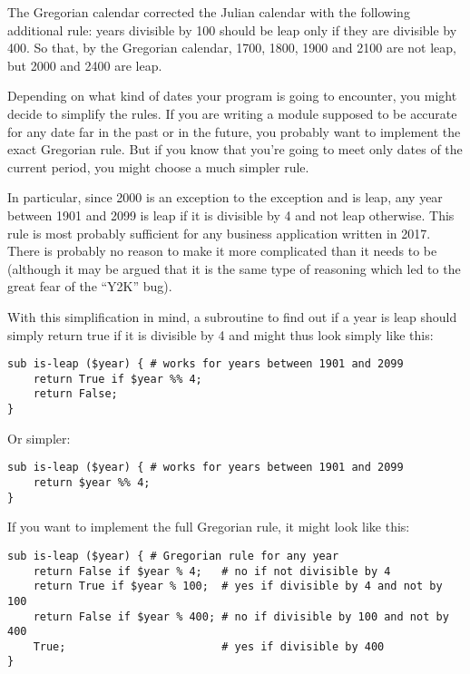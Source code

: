 {
The Gregorian calendar corrected the Julian calendar with 
the following additional rule: years divisible by 100 should 
be leap only if they are divisible by 400. So that, by the Gregorian calendar, 1700, 1800, 1900 and 2100 are not leap, but 2000 and 2400 are leap.

Depending on what kind of dates your program is going to 
encounter, you might decide to simplify the rules. If 
you are writing a module supposed to be accurate for any 
date far in the past or in the future, you probably want 
to implement the exact Gregorian rule. But if you know 
that you're going to meet only dates of the current 
period, you might choose a much simpler rule.

In particular, since 2000 is an exception to the exception 
and is leap, any year between 1901 and 2099 is leap if it 
is divisible by 4 and not leap otherwise. This rule is 
most probably sufficient for any business application 
written in 2017. There is probably no reason to make it 
more complicated than it needs to be (although it may be 
argued that it is the same type of reasoning which led to 
the great fear of the ``Y2K'' bug). 

With this simplification in mind, a subroutine to find out 
if a year is leap should simply return true if it is 
divisible by 4 and might thus look simply like this:

\begin{verbatim}
sub is-leap ($year) { # works for years between 1901 and 2099
    return True if $year %% 4; 
    return False;
}
\end{verbatim}

Or simpler:

\begin{verbatim}
sub is-leap ($year) { # works for years between 1901 and 2099
    return $year %% 4; 
}
\end{verbatim}

If you want to implement the full Gregorian rule, it might 
look like this:

\begin{verbatim}
sub is-leap ($year) { # Gregorian rule for any year
    return False if $year % 4;   # no if not divisible by 4
    return True if $year % 100;  # yes if divisible by 4 and not by 100
    return False if $year % 400; # no if divisible by 100 and not by 400
    True;                        # yes if divisible by 400
}
\end{verbatim}

}

